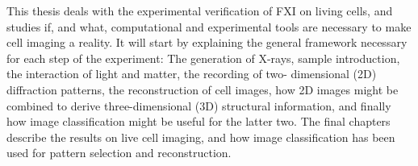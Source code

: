 This thesis deals with the experimental verification of FXI on living cells, and studies if, and what, computational and experimental tools are necessary to make cell imaging a reality. It will start by explaining the general framework necessary for each step of the experiment: The generation of X-rays, sample introduction, the interaction of light and matter, the recording of two- dimensional (2D) diffraction patterns, the reconstruction of cell images, how 2D images might be combined to derive three-dimensional (3D) structural information, and finally how image classification might be useful for the latter two. The final chapters describe the results on live cell imaging, and how image classification has been used for pattern selection and reconstruction.




